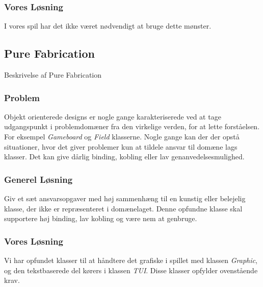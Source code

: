 \subsubsection*{Vores Løsning}
I vores spil har det ikke været nødvendigt at bruge dette mønster.
\subsection{Pure Fabrication}
Beskrivelse af Pure Fabrication
\subsubsection*{Problem}
Objekt orienterede designs er nogle gange karakteriserede ved at tage udgangspunkt i problemdomæner fra den virkelige verden, for at lette forståelsen. For eksempel \textit{Gameboard} og \textit{Field} klasserne. Nogle gange kan der der opstå situationer, hvor det giver problemer kun at tildele ansvar til domæne lags klasser. Det kan give dårlig binding, kobling eller lav genanvedelsesmulighed.
\subsubsection*{Generel Løsning}
Giv et sæt ansvarsopgaver med høj sammenhæng til en kunstig eller belejelig klasse, der ikke er repræsenteret i domænelaget. Denne opfundne klasse skal supportere høj binding, lav kobling og være nem at genbruge.
\subsubsection*{Vores Løsning}
Vi har opfundet klasser til at håndtere det grafiske i spillet med klassen \textit{Graphic}, og den tekstbaserede del kørers i klassen \textit{TUI}. Disse klasser opfylder ovenstående krav.